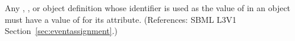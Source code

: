 Any \Compartment, \Species, \Parameter or \SpeciesReference object
definition whose identifier is used as the value of  in an
\EventAssignment object must have a value of  for its
 attribute.  (References: SBML L3V1
Section~\ref{sec:eventassignment}.)
